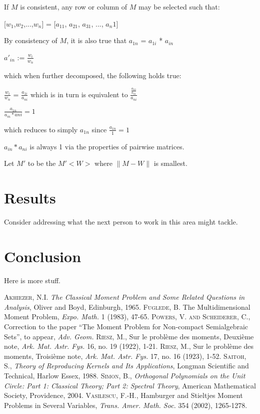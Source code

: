 \documentclass[12pt]{amsart}
\theoremstyle{definition}
\begin{document}
If $M$ is consistent, any row or column of $M$ may be selected such that:

[$w_1$,$w_2$,...,$w_n$] = [$a_{11}$, $a_{21}$, $a_{31}$, ..., $a_n1$]

By consistency of $M$, it is also true that 
$a_{1n}$ = $a_{1i}$ * $a_{in}$

$a'_{in}$ := $\frac{w_i}{w_n}$

which when further decomposed, the following holds true:

$\frac{w_i}{w_n}$ = $\frac{a_{1i}}{a_{ni}}$ which is in turn is equivalent to $\frac{\frac{a_{1n}}{a_{in}}}{a_{ni}}$

$\frac{a_{1n}}{a_{in}*a{ni}} = 1$

which reduces to simply $a_{1n}$ since $\frac{a_{1n}}{1} = 1$

${a_{in}*a_{ni}}$ is always 1 via the properties of pairwise matrices.

Let $M'$ to be the $M'<W>$ where $\|M-W\|$ is smallest.






\section{Results}

Consider addressing what the next person to work in this area might tackle.

\section{Conclusion}

Here is more stuff.

\begin{thebibliography}{9}
     \textsc{Akhiezer, N.I.}  \emph{The Classical Moment Problem and Some Related Questions in Analysis},
        Oliver and Boyd, Edinburgh, 1965.
     \textsc{Fuglede, B.}  The Multidimensional Moment Problem, \emph{Expo. Math.} 1 (1983), 47-65.
     \textsc{Powers, V. and Scheiderer, C.}, Correction to the paper ``The Moment Problem for Non-compact
        Semialgebraic Sets'', to appear, \emph{Adv. Geom.}
     \textsc{Riesz, M.}, Sur le probl\`eme des moments, Deuxi\`eme note, \emph{Ark. Mat. Astr. Fys.} 16,
        no. 19 (1922), 1-21.
     \textsc{Riesz, M.}, Sur le probl\`eme des moments, Troisi\`eme note, \emph{Ark. Mat. Astr. Fys.} 17,
        no. 16 (1923), 1-52.
     \textsc{Saitoh, S.},  \emph{Theory of Reproducing Kernels and Its Applications}, Longman Scientific and
        Technical, Harlow Essex, 1988.
     \textsc{Simon, B.}, \emph{Orthogonal Polynomials on the Unit Circle: Part 1: Classical Theory; Part 2:
        Spectral Theory}, American Mathematical Society, Providence, 2004.
     \textsc{Vasilescu, F.-H.}, Hamburger and Stieltjes Moment Problems in Several Variables, \emph{Trans.
        Amer. Math. Soc.} 354 (2002), 1265-1278.
\end{thebibliography}
\end{document}

